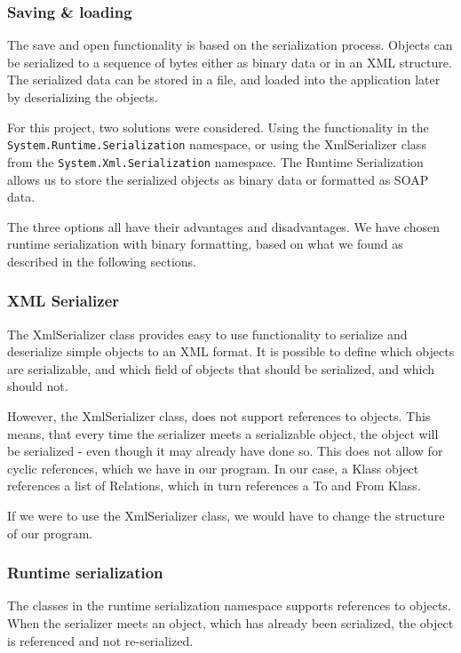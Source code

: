 \subsubsection{Saving \& loading}
The save and open functionality is based on the serialization process. Objects can be serialized to a sequence of bytes either as binary data or in an XML structure. The serialized data can be stored in a file, and loaded into the application later by deserializing the objects.

For this project, two solutions were considered. Using the functionality in the \texttt{System.Runtime.Serialization} namespace, or using the XmlSerializer class from the \texttt{System.Xml.Serialization} namespace. The Runtime Serialization allows us to store the serialized objects as binary data or formatted as SOAP data.

The three options all have their advantages and disadvantages. We have chosen runtime serialization with binary formatting, based on what we found as described in the following sections.

\subsubsection{XML Serializer}
The XmlSerializer class provides easy to use functionality to serialize and deserialize simple objects to an XML format. It is possible to define which objects are serializable, and which field of objects that should be serialized, and which should not.

However, the XmlSerializer class, does not support references to objects. This means, that every time the serializer meets a serializable object, the object will be serialized - even though it may already have done so. This does not allow for cyclic references, which we have in our program. In our case, a Klass object references a list of Relations, which in turn references a To and From Klass.

If we were to use the XmlSerializer class, we would have to change the structure of our program.

\subsubsection{Runtime serialization}
The classes in the runtime serialization namespace supports references to objects. When the serializer meets an object, which has already been serialized, the object is referenced and not re-serialized.

